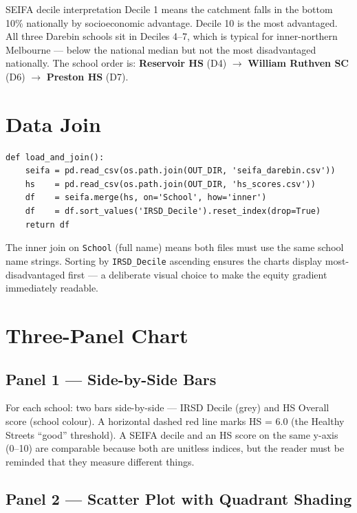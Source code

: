 \documentclass[11pt,a4paper,openany]{book}
\begin{document}
\begin{keybox}{SEIFA decile interpretation}
Decile 1 means the catchment falls in the bottom 10\% nationally by socioeconomic
advantage.  Decile 10 is the most advantaged.  All three Darebin schools sit in
Deciles 4--7, which is typical for inner-northern Melbourne --- below the national
median but not the most disadvantaged nationally.
The school order is:
\textbf{Reservoir HS} (D4) $\to$ \textbf{William Ruthven SC} (D6) $\to$ \textbf{Preston HS} (D7).
\end{keybox}

\section{Data Join}

\begin{lstlisting}[style=python, caption={load\_and\_join() in equity\_analysis.py}]
def load_and_join():
    seifa = pd.read_csv(os.path.join(OUT_DIR, 'seifa_darebin.csv'))
    hs    = pd.read_csv(os.path.join(OUT_DIR, 'hs_scores.csv'))
    df    = seifa.merge(hs, on='School', how='inner')
    df    = df.sort_values('IRSD_Decile').reset_index(drop=True)
    return df
\end{lstlisting}

The inner join on \texttt{School} (full name) means both files must use the same school
name strings.  Sorting by \texttt{IRSD\_Decile} ascending ensures the charts display
most-disadvantaged first --- a deliberate visual choice to make the equity gradient
immediately readable.

\section{Three-Panel Chart}

\subsection{Panel 1 --- Side-by-Side Bars}

For each school: two bars side-by-side --- IRSD Decile (grey) and HS Overall score
(school colour).  A horizontal dashed red line marks HS = 6.0 (the Healthy Streets
``good'' threshold).  A SEIFA decile and an HS score on the same y-axis (0--10) are
comparable because both are unitless indices, but the reader must be reminded that
they measure different things.

\subsection{Panel 2 --- Scatter Plot with Quadrant Shading}
\end{document}
